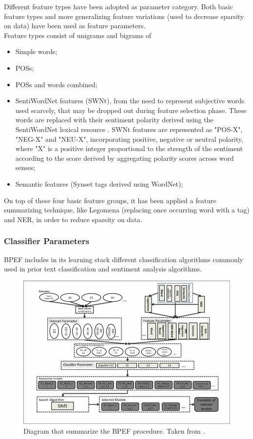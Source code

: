 Different feature types have been adopted as parameter category. Both basic feature types and more generalizing feature variations (used to decrease sparsity on data) have been used as feature parameters.\\
Feature types consist of unigrams and bigrams of
\begin{itemize}
	\item Simple words;
	\item \aclp{POS};
	\item \aclp{POS} and words combined;
	\item SentiWordNet features (SWNt), from the need to represent subjective words used scarcely, that may be dropped out during feature selection phase. These words are replaced with their sentiment polarity derived using the SentiWordNet lexical resource \cite{Esuli2006sentiwordnet}. SWNt features are represented as "POS-X", "NEG-X" and "NEU-X", incorporating positive, negative or neutral polarity, where "X" is a positive integer proportional to the strength of the sentiment according to the score derived by aggregating polarity scores across word senses;
	\item Semantic features (Synset tags derived using WordNet);
\end{itemize}

On top of these four basic feature groups, it has been applied a feature summarizing technique, like Legomena (replacing once occurring word with a tag) and \ac{NER}, in order to reduce sparsity on data.

\subsubsection{Classifier Parameters}

\ac{BPEF} includes in its learning stack different classification algorithms commonly used in prior text classification and sentiment analysis algorithms. \\

\begin{figure}[ht]
	\centering
	\includegraphics[width=1\textwidth]{figures/bpef.png}
	\caption{Diagram that summarize the \ac{BPEF} procedure. Taken from \cite{Hassan2013TwitterSA}.}
	\label{fig:bpef}
\end{figure}


